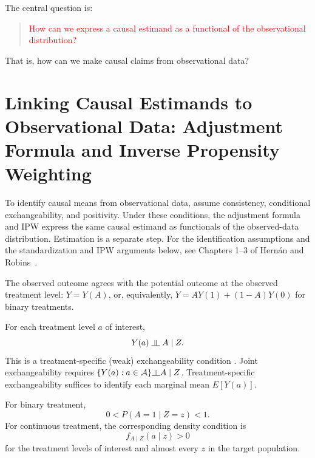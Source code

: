 \documentclass[11pt,twoside]{article}
\begin{document}
The central question is:
\begin{quote}
\textcolor{red}{How can we express a causal estimand as a functional of
 the observational distribution?}
\end{quote}
That is, how can we make causal claims from observational data?

\section{Linking Causal Estimands to Observational Data: Adjustment Formula and Inverse Propensity Weighting}
\label{sec:identification}

To identify causal means from observational data, assume consistency, conditional exchangeability, and positivity. Under these conditions, the adjustment formula and IPW express the same causal estimand as functionals of the observed-data distribution. Estimation is a separate step.
For the identification assumptions and the standardization and IPW arguments below, see Chapters 1--3 of Hern{\'a}n and Robins~\cite{hernanrobins2020whatif}.

\begin{assumption}[Consistency]
The observed outcome agrees with the potential outcome at the
 observed treatment level: $Y=Y(A)$, or, equivalently, \(Y=AY(1)+(1-A)Y(0)\) for binary treatments.
\end{assumption}

\begin{assumption}
For each treatment level $a$ of interest,
\begin{equation}
\label{eq:ignorability}
    Y(a) \mathrel{\indep} A \mid Z.
\end{equation}
This is a treatment-specific (weak) exchangeability condition \cite{Hirano2004}. Joint exchangeability requires $\{Y(a):a\in\mathcal A\}\indep A\mid Z$. Treatment-specific exchangeability suffices to identify each marginal mean $E[Y(a)]$.
\end{assumption}

\begin{assumption}
For binary treatment,
\begin{equation}
\label{eq:binary-positivity}
    0 < P(A=1\mid Z=z) < 1.
\end{equation}
For continuous treatment, the corresponding density condition is
\begin{equation}
\label{eq:continuous-positivity}
    f_{A\mid Z}(a\mid z)>0
\end{equation}
for the treatment levels of interest and almost every $z$ in the
 target population.
\end{assumption}
\end{document}
